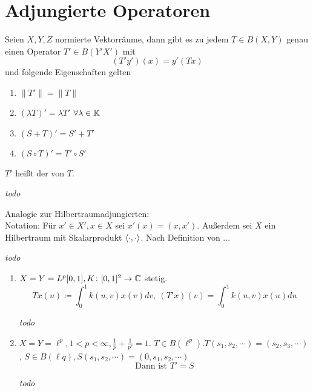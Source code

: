 

\section{Adjungierte Operatoren}


\begin{satz}
	Seien $X, Y, Z$ normierte Vektorräume, dann gibt es zu jedem $T \in B(X, Y)$ genau einen Operator $T' \in B(Y' X')$ mit 
	\[ (T' y')(x) = y'(T x) \]
	und folgende Eigenschaften gelten
	\begin{enumerate}[label=(\roman*\upshape)]
		\item $\| T' \| = \| T \|$
		\item $( \lambda T )' = \lambda T'$ $\forall \lambda \in \mathbb{K}$
		\item $(S + T)' = S' + T'$
		\item $(S \circ T)' = T' \circ S'$
	\end{enumerate}	
	$T'$ hei{\ss}t der  von $T$.
\end{satz}

\begin{beweis}
	\textit{todo} %
\end{beweis}


\begin{bemerkung}
	Analogie zur Hilbertraumadjungierten: \\
	Notation: Für $x' \in X', x \in X$ sei $x'(x) = (x, x')$. Außerdem sei $X$ ein Hilbertraum mit Skalarprodukt $\langle \cdot , \cdot \rangle$.  Nach Definition von ... %
\end{bemerkung}

\begin{beweis}
	\textit{todo} %
\end{beweis}


\begin{beispiel}
	\begin{enumerate}[label=\alph*\upshape)]
		\item $X = Y = L^{p}[0, 1], K \colon [0, 1]^{2} \rightarrow \mathbb{C}$ stetig.
			\[ T x(u) \coloneqq \int_{0}^{1} k(u, v) x(v) dv, ~ \left( T' x \right)(v) = \int_{0}^{1} k(u, v) x(u) du \]
		  \begin{beweis}
		  	\textit{todo} %
		  \end{beweis}
		\item $X =Y = \ell^{p}, 1 < p < \infty, \frac{1}{p} + \frac{1}{p'} = 1$. $T \in B(\ell^{p}). T(s_{1}, s_{2}, \cdots) = (s_{2}, s_{3}, \cdots)$, $S \in B(\ell{q}), S(s_{1}, s_{2}, \cdots) = (0, s_{1}, s_{2}, \cdots)$
			\[ \text{Dann ist } T' = S \]
		  \begin{beweis}
		  	\textit{todo} %
		  \end{beweis}
	\end{enumerate}
\end{beispiel}

